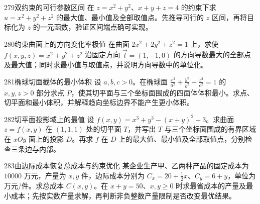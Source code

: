 \begin{exercise}{279}{双约束的可行参数区间}
在 $z=x^2+y^2$、$x+y+z=4$ 的约束下求 $u=x^2+y^2+z^2$ 的最大值、最小值及全部取值点。先推导可行的 $z$ 区间，再将目标化为 $z$ 的一元函数，验证区间端点确可实现。
\end{exercise}
\begin{exercise}{280}{约束曲面上的方向变化率极值}
在曲面 $2x^2+2y^2+z^2=1$ 上，求使 $f(x,y,z)=x^2+y^2+z^2$ 沿固定方向 $\vec l=(1,-1,0)$ 的方向导数最大的全部点及最大值；同时求最小值与取值点，并说明方向导数中的单位化。
\end{exercise}
\begin{exercise}{281}{椭球切面截体的最小体积}
设 $a,b,c>0$。在椭球面 $\frac{x^2}{a^2}+\frac{y^2}{b^2}+\frac{z^2}{c^2}=1$ 的 $x,y,z>0$ 部分求点 $P$，使其切平面与三个坐标面围成的四面体体积最小。求点、切平面和最小体积，并解释趋向坐标边界不能产生更小体积。
\end{exercise}
\begin{exercise}{282}{切平面投影域上的最值}
设 $f(x,y)=x^3+y^3-(x+y)^2+3$。求曲面 $z=f(x,y)$ 在 $(1,1,1)$ 处的切平面 $T$，并写出 $T$ 与三个坐标面围成的有界区域在 $xOy$ 面上的投影 $D$。再求 $f$ 在 $D$ 上的最大值、最小值及全部取值点，分别检查三条边与内部。
\end{exercise}
\begin{exercise}{283}{由边际成本恢复总成本与约束优化}
某企业生产甲、乙两种产品的固定成本为 $10000$ 万元，产量为 $x,y$ 件，边际成本分别为 $C_x=20+\frac12x$、$C_y=6+y$，单位为万元/件。求总成本 $C(x,y)$。在 $x+y=50$、$x,y\ge0$ 时求最省成本的产量及最小成本；先按实数产量求解，再判断非负整数产量限制是否改变最优结果。
\end{exercise}
